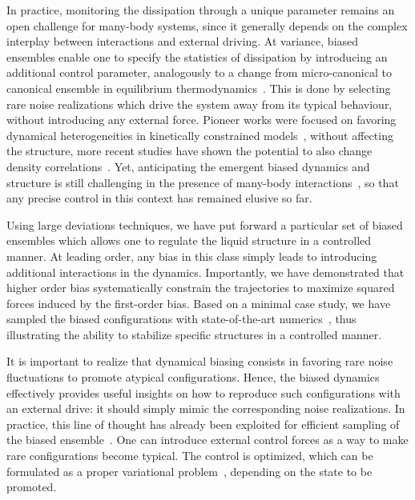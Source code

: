 \documentclass[pre, superscriptaddress, twocolumn,pre]{revtex4-1}
\begin{document}
In practice, monitoring the dissipation through a unique parameter remains an open challenge for many-body systems, since it generally depends on the complex interplay between interactions and external driving. At variance, biased ensembles enable one to specify the statistics of dissipation by introducing an additional control parameter, analogously to a change from micro-canonical to canonical ensemble in equilibrium thermodynamics~\cite{Chetrite2013, Jack2010}. This is done by selecting rare noise realizations which drive the system away from its typical behaviour, without introducing any external force. Pioneer works were focused on favoring dynamical heterogeneities in kinetically constrained models~\cite{garrahan2007, Hedges2009, Pitard2011, Speck2012, Bodineau2012a}, without affecting the structure, more recent studies have shown the potential to also change density correlations~\cite{Jack2014, Cagnetta2017, nemoto2018optimizing}. Yet, anticipating the emergent biased dynamics and structure is still challenging in the presence of many-body interactions~\cite{Chetrite2013, Jack2010}, so that any precise control in this context has remained elusive so far.


Using large deviations techniques, we have put forward a particular set of biased ensembles which allows one to regulate the liquid structure in a controlled manner. At leading order, any bias in this class simply leads to introducing additional interactions in the dynamics. Importantly, we have demonstrated that higher order bias systematically constrain the trajectories to maximize squared forces induced by the first-order bias. Based on a minimal case study, we have sampled the biased configurations with state-of-the-art numerics~\cite{Giadina2006, tailleur2007probing, Hurtado2009, Nemoto2016, Ray2018, Klymko2018, Brewer2018}, thus illustrating the ability to stabilize specific structures in a controlled manner.


It is important to realize that dynamical biasing consists in favoring rare noise fluctuations to promote atypical configurations. Hence, the biased dynamics effectively provides useful insights on how to reproduce such configurations with an external drive: it should simply mimic the corresponding noise realizations. In practice, this line of thought has already been exploited for efficient sampling of the biased ensemble~\cite{Nemoto2016, Jack2017, Jack2018}. One can introduce external control forces as a way to make rare configurations become typical. The control is optimized, which can be formulated as a proper variational problem~\cite{Nemoto2011, Chetrite2015, Jack2015}, depending on the state to be promoted.
\end{document}
